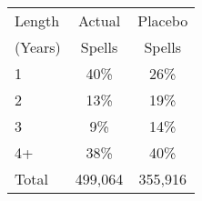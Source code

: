 \begin{tabular}{lcc}
\toprule
Length & Actual & Placebo \\
(Years) & Spells & Spells \\
\midrule
1 & 40\% & 26\% \\
2 & 13\% & 19\% \\
3 & 9\% & 14\% \\
4+ & 38\% & 40\% \\
Total &      499,064 &      355,916 \\
\bottomrule
\end{tabular}
